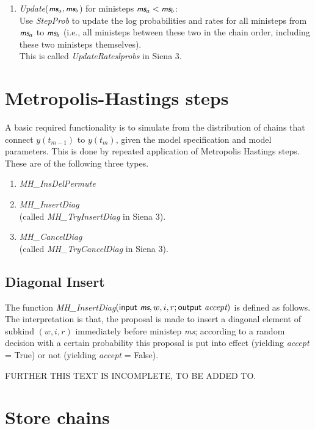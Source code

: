 \documentclass[a4paper,fleqn,12pt]{article}
\newcommand{\ms}{\textsl{\textsf{\small ms}}} %
\begin{document}
\begin{enumerate}[resume]
\item \textit{Update}($\ms_a, \ms_b$) for ministeps $\ms_a < \ms_b$:\\
       Use \textit{StepProb} to update the log probabilities and rates for all ministeps
       from $\ms_a$ to $\ms_b$ (i.e., all ministeps between these two in the chain order,
       including these two ministeps themselves).\\
       This is called \textit{UpdateRateslprobs} in Siena 3.
\end{enumerate}


\section{Metropolis-Hastings steps}

A basic required functionality is to simulate from the distribution
of chains that connect $y(t_{m-1})$ to $y(t_m)$,
given the model specification and model parameters.
This is done by repeated application of Metropolis Hastings steps.
These are of the following three types.

\begin{enumerate}
\item \textit{MH\_InsDelPermute}
\item \textit{MH\_InsertDiag}\\
      (called \textit{MH\_TryInsertDiag} in Siena 3).
\item \textit{MH\_CancelDiag}\\
      (called \textit{MH\_TryCancelDiag} in Siena 3).
\end{enumerate}

\subsection{Diagonal Insert}

The function \textit{MH\_InsertDiag}$(\textsf{input}\ \ms, w,i,r; \textsf{output}\ \textit{accept})$
is defined as follows.
The interpretation is that,
the proposal is made to insert a diagonal element of subkind
$(w,i,r)$ immediately before ministep \ms;
according to a random decision with a certain probability
this proposal is put into effect (yielding \textit{accept} = True)
or not (yielding \textit{accept} = False).

FURTHER THIS TEXT IS INCOMPLETE, TO BE ADDED TO.

\section{Store chains}
\end{document}
